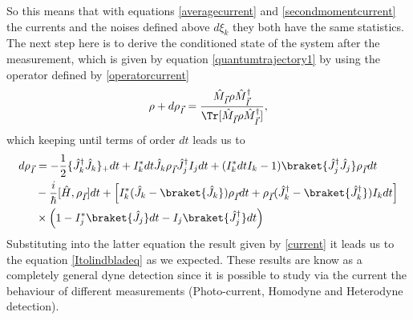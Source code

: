 So this means that with equations \eqref{averagecurrent} and \eqref{secondmomentcurrent} the currents and the noises defined above $d\xi_{k}$  they both have the same statistics.\\
The next step here is to derive the conditioned state of the system after the measurement, which is given by equation \eqref{quantumtrajectory1} by using the operator defined by \eqref{operatorcurrent}
\[\rho+d\rho_{\vec{I}}=\frac{\hat{M}_{\vec{I}}\rho\hat{M}_{\vec{I}}^{\dagger}}{\Tr[\hat{M}_{\vec{I}}\rho\hat{M}_{\vec{I}}^{\dagger}]},\]
which keeping until terms of order $dt$ leads us to
\begin{align}
d\rho_{\vec{I}}&=-\frac{1}{2}\{\hat{J}_{k}^{\dagger}\hat{J}_{k}\}_{+}dt + I_{k}^{*}dt\hat{J}_{k}\rho_{\vec{I}}\hat{J}_{j}^{\dagger}I_{j}dt+(I_{k}^{*}dtI_{k}-1)\braket{\hat{J}_{j}^{\dagger}\hat{J}_{j}}\rho_{\vec{I}}dt\nonumber\\
&-\frac{i}{\hbar}[\hat{H},\rho_{\vec{I}}]dt+\left[I^{*}_{k}(\hat{J}_{k}-\braket{\hat{J}_{k}})\rho_{\vec{I}}dt+\rho_{\vec{I}}(\hat{J}_{k}^{\dagger}-\braket{\hat{J}_{k}^{\dagger}})I_{k}dt\right]\nonumber\\
&\times\left(1-I^{*}_{j}\braket{\hat{J_{j}}}dt-I_{j}\braket{\hat{J}^{\dagger}_{j}}dt\right)
\label{evolution}
\end{align}
Substituting into the latter equation the result given by \eqref{current} it leads us to the equation \eqref{Itolindbladeq} as we expected. These results are know as a completely general dyne detection since it is possible to study via the current the behaviour of different measurements (Photo-current, Homodyne and Heterodyne detection). \\
